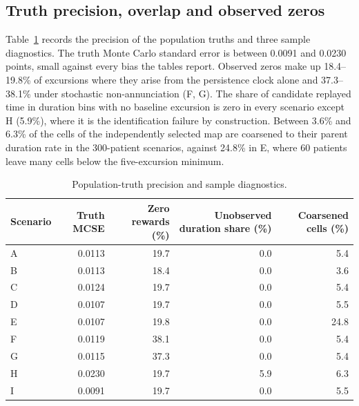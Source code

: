 \documentclass[11pt,letterpaper]{article}
\begin{document}
\subsection{Truth precision, overlap and observed zeros}
Table~\ref{stab:simdiag} records the precision of the population truths and three sample diagnostics. The truth Monte Carlo standard error is between 0.0091 and 0.0230 points, small against every bias the tables report. Observed zeros make up 18.4--19.8\% of excursions where they arise from the persistence clock alone and 37.3--38.1\% under stochastic non-annunciation (F, G). The share of candidate replayed time in duration bins with no baseline excursion is zero in every scenario except H (5.9\%), where it is the identification failure by construction. Between 3.6\% and 6.3\% of the cells of the independently selected map are coarsened to their parent duration rate in the 300-patient scenarios, against 24.8\% in E, where 60 patients leave many cells below the five-excursion minimum.
\begin{table}[htbp]\centering\small
\caption{Population-truth precision and sample diagnostics.}\label{stab:simdiag}
\begin{tabular}{@{}lrrrr@{}}\toprule
Scenario & Truth MCSE & Zero rewards (\%) & Unobserved duration share (\%) & Coarsened cells (\%)\\\midrule
A & 0.0113 & 19.7 & 0.0 & 5.4\\
B & 0.0113 & 18.4 & 0.0 & 3.6\\
C & 0.0124 & 19.7 & 0.0 & 5.4\\
D & 0.0107 & 19.7 & 0.0 & 5.5\\
E & 0.0107 & 19.8 & 0.0 & 24.8\\
F & 0.0119 & 38.1 & 0.0 & 5.4\\
G & 0.0115 & 37.3 & 0.0 & 5.4\\
H & 0.0230 & 19.7 & 5.9 & 6.3\\
I & 0.0091 & 19.7 & 0.0 & 5.5\\
\bottomrule\end{tabular}
\end{table}
\end{document}
